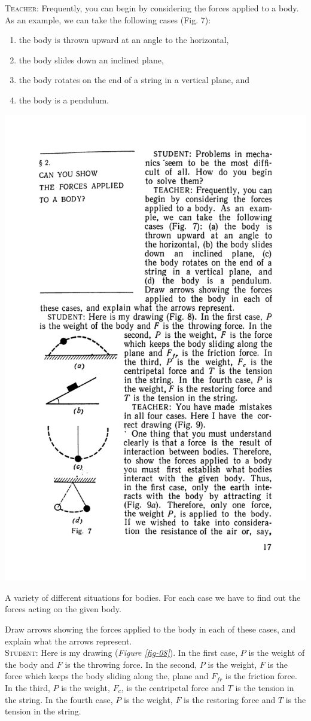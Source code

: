 \documentclass[a4paper,sfsidenotes]{tufte-book}
\begin{document}
\textsc{Teacher:} Frequently, you can begin by considering the forces applied to a body. As an example, we can take the following cases (Fig. 7): 
\begin{enumerate}[label=(\alph*), leftmargin=*]
\item the body is thrown upward at an angle to the horizontal, 
\item the body slides down an inclined plane, 
\item the body rotates on the end of a string in a vertical plane, and
\item the body is a pendulum.
\end{enumerate}

\begin{marginfigure}
\centering
\includegraphics[width=0.7\linewidth]{fig-007a.pdf}
\caption{A variety of different situations for bodies. For each case we have to find out the forces acting on the given body.}
\label{fig-07}
\end{marginfigure}

Draw arrows showing the forces applied to the body in each of these cases, and explain what the arrows represent.\\

\textsc{Student:} Here is my drawing (\emph{Figure \ref{fig-08}}). In the first case, $P$ is the weight of the body and $F$ is the throwing force. In the second, $P$ is the weight, $F$ is the force which keeps the body sliding along the, plane and $F_{fr}$ is the friction force. In the third, $P$ is the weight, $F_{c}$, is the
centripetal force and $T$ is the tension in the string. In the fourth case, $P$ is the weight, $F$ is the restoring force and $T$ is the tension in the string. \\
\end{document}
